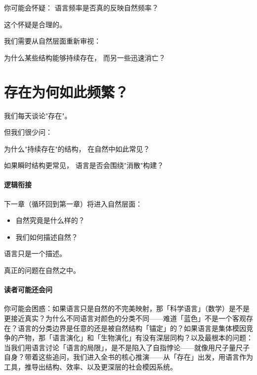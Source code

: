 \documentclass[../main.tex]{subfiles}
\begin{document}
\begin{tcolorbox}[colback=yellow!5,title=\textit{读者行为预测}]
	你可能会怀疑：
	语言频率是否真的反映自然频率？
\end{tcolorbox}

这个怀疑是合理的。

我们需要从自然层面重新审视：

为什么某些结构能够持续存在，
而另一些迅速消亡？


\section{存在为何如此频繁？}

我们每天谈论"存在"。

但我们很少问：

为什么"持续存在"的结构，
在自然中如此常见？

如果瞬时结构更常见，
语言是否会围绕"消散"构建？

\paragraph{逻辑衔接}

下一章（循环回到第一章）将进入自然层面：

\begin{itemize}
	\item 自然究竟是什么样的？
	\item 我们如何描述自然？

\end{itemize}

语言只是一个描述。

真正的问题在自然之中。

\paragraph*{读者可能还会问}
你可能会困惑：如果语言只是自然的不完美映射，那「科学语言」（数学）是不是更接近真实？为什么不同语言对颜色的分类不同——难道「蓝色」不是一个客观存在？语言的分类边界是任意的还是被自然结构「锚定」的？如果语言是集体模因竞争的产物，那「语言演化」和「生物演化」有没有深层同构？以及最根本的问题：当我们用语言讨论「语言的局限」，是不是陷入了自指悖论——就像用尺子量尺子自身？带着这些追问，我们进入全书的核心推演——从「存在」出发，用语言作为工具，推导出结构、效率、以及更深层的社会模因系统。
\end{document}
